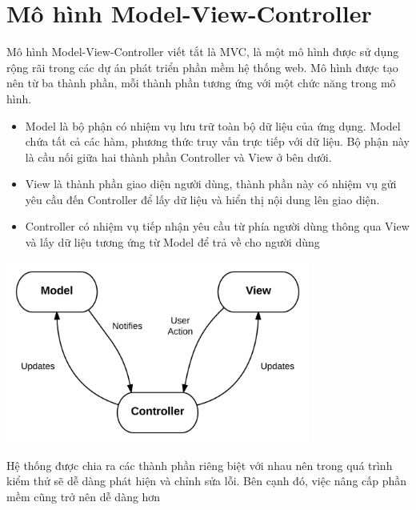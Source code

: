 \section{Mô hình Model-View-Controller}
Mô hình Model-View-Controller viết tắt là MVC, là một mô hình được sử dụng rộng rãi trong các dự án phát triển phần mềm hệ thống web. Mô hình được tạo nên từ ba thành phần, mỗi thành phần tương ứng với một chức năng trong mô hình.
\begin{itemize}
    \item Model là bộ phận có nhiệm vụ lưu trữ toàn bộ dữ liệu của ứng dụng. Model chứa tất cả các hàm, phương thức truy vấn trực tiếp với dữ liệu. Bộ phận này là cầu nối giữa hai thành phần Controller và View ở bên dưới. 
    \item View là thành phần giao diện người dùng, thành phần này có nhiệm vụ gửi yêu cầu đến Controller để lấy dữ liệu và hiển thị nội dung lên giao diện.
    \item Controller có nhiệm vụ tiếp nhận yêu cầu từ phía người dùng thông qua View và lấy dữ liệu tương ứng từ Model để trả về cho người dùng
\end{itemize}
\begin{center}
  \captionsetup{type=figure}
  \includegraphics[width=10cm]{img/MVC.png}
\end{center}
\indent Hệ thống được chia ra các thành phần riêng biệt với nhau nên trong quá trình kiểm thử sẽ dễ dàng phát hiện và chỉnh sửa lỗi. Bên cạnh đó, việc nâng cấp phần mềm cũng trở nên dễ dàng hơn
